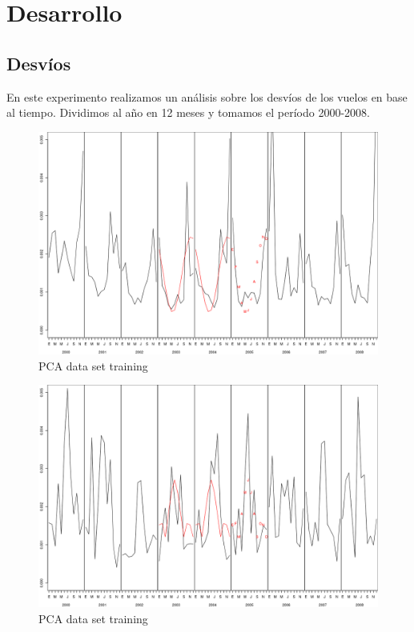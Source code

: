 \section{Desarrollo}
\subsection{Desv\'ios}

En este experimento realizamos un análisis sobre los desvíos de los vuelos en base al tiempo. Dividimos al año en 12 meses y tomamos el período 2000-2008. 

\begin{figure}[h!]
  \begin{center}
	\includegraphics[scale=0.5]{img/plot_CA_2003-2005.png}
	\caption{PCA data set training}
  \end{center}
\end{figure}

\begin{figure}[h!]
  \begin{center}
	\includegraphics[scale=0.5]{img/plot_FL_2003-2005.png}
	\caption{PCA data set training}
  \end{center}
\end{figure}